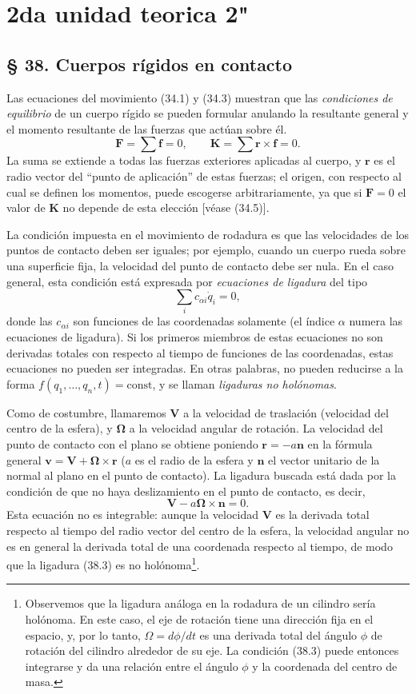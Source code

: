\documentclass[12pt]{article}
\begin{document}
\section{2da unidad teorica 2"}
\subsection*{§ 38. Cuerpos rígidos en contacto}

Las ecuaciones del movimiento (34.1) y (34.3) muestran que las \textit{condiciones de equilibrio} de un cuerpo rígido se pueden formular anulando la resultante general y el momento resultante de las fuerzas que actúan sobre él.
\[
\mathbf{F} = \sum \mathbf{f} = 0, \qquad \mathbf{K} = \sum \mathbf{r} \times \mathbf{f} = 0. \tag{38.1}
\]
La suma se extiende a todas las fuerzas exteriores aplicadas al cuerpo, y $\mathbf{r}$ es el radio vector del ``punto de aplicación'' de estas fuerzas; el origen, con respecto al cual se definen los momentos, puede escogerse arbitrariamente, ya que si $\mathbf{F} = 0$ el valor de $\mathbf{K}$ no depende de esta elección [véase (34.5)].

La condición impuesta en el movimiento de rodadura es que las velocidades de los puntos de contacto deben ser iguales; por ejemplo, cuando un cuerpo rueda sobre una superficie fija, la velocidad del punto de contacto debe ser nula. En el caso general, esta condición está expresada por \textit{ecuaciones de ligadura} del tipo
\[
\sum_i c_{\alpha i} \dot{q}_i = 0, \tag{38.2}
\]
donde las $c_{\alpha i}$ son funciones de las coordenadas solamente (el índice $\alpha$ numera las ecuaciones de ligadura). Si los primeros miembros de estas ecuaciones no son derivadas totales con respecto al tiempo de funciones de las coordenadas, estas ecuaciones no pueden ser integradas. En otras palabras, no pueden reducirse a la forma $f(q_1, \ldots, q_n, t) = \text{const}$, y se llaman \textit{ligaduras no holónomas}.

Como de costumbre, llamaremos $\mathbf{V}$ a la velocidad de traslación (velocidad del centro de la esfera), y $\mathbf{\Omega}$ a la velocidad angular de rotación. La velocidad del punto de contacto con el plano se obtiene poniendo $\mathbf{r} = -a\mathbf{n}$ en la fórmula general $\mathbf{v} = \mathbf{V} + \mathbf{\Omega} \times \mathbf{r}$ ($a$ es el radio de la esfera y $\mathbf{n}$ el vector unitario de la normal al plano en el punto de contacto). La ligadura buscada está dada por la condición de que no haya deslizamiento en el punto de contacto, es decir,
\[
\mathbf{V} - a \mathbf{\Omega} \times \mathbf{n} = 0. \tag{38.3}
\]
Esta ecuación no es integrable: aunque la velocidad $\mathbf{V}$ es la derivada total respecto al tiempo del radio vector del centro de la esfera, la velocidad angular no es en general la derivada total de una coordenada respecto al tiempo, de modo que la ligadura (38.3) es no holónoma\footnote{Observemos que la ligadura análoga en la rodadura de un cilindro sería holónoma. En este caso, el eje de rotación tiene una dirección fija en el espacio, y, por lo tanto, $\Omega = d\phi/dt$ es una derivada total del ángulo $\phi$ de rotación del cilindro alrededor de su eje. La condición (38.3) puede entonces integrarse y da una relación entre el ángulo $\phi$ y la coordenada del centro de masa.}.
\end{document}
